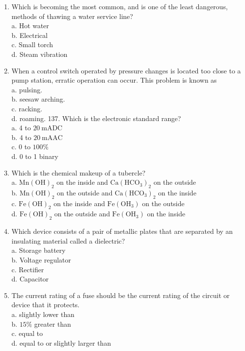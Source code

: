 \documentclass[10pt]{article}
\begin{document}
\begin{enumerate}
  \item Which is becoming the most common, and is one of the least dangerous, methods of thawing a water service line?\\
a. Hot water\\
b. Electrical\\
c. Small torch\\
d. Steam vibration

  \item When a control switch operated by pressure changes is located too close to a pump station, erratic operation can occur. This problem is known as\\
a. pulsing.\\
b. seesaw arching.\\
c. racking.\\
d. roaming. 137. Which is the electronic standard range?\\
a. 4 to $20 \mathrm{~mA} \mathrm{DC}$\\
b. 4 to $20 \mathrm{~mA} \mathrm{AC}$\\
c. 0 to $100 \%$\\
d. 0 to 1 binary

  \item Which is the chemical makeup of a tubercle?\\
a. $\mathrm{Mn}(\mathrm{OH})_{2}$ on the inside and $\mathrm{Ca}\left(\mathrm{HCO}_{3}\right)_{2}$ on the outside\\
b. $\mathrm{Mn}(\mathrm{OH})_{2}$ on the outside and $\mathrm{Ca}\left(\mathrm{HCO}_{3}\right)_{2}$ on the inside\\
c. $\mathrm{Fe}(\mathrm{OH})_{2}$ on the inside and $\mathrm{Fe}\left(\mathrm{OH}_{3}\right)$ on the outside\\
d. $\mathrm{Fe}(\mathrm{OH})_{2}$ on the outside and $\mathrm{Fe}\left(\mathrm{OH}_{3}\right)$ on the inside

  \item Which device consists of a pair of metallic plates that are separated by an insulating material called a dielectric?\\
a. Storage battery\\
b. Voltage regulator\\
c. Rectifier\\
d. Capacitor

  \item The current rating of a fuse should be the current rating of the circuit or device that it protects.\\
a. slightly lower than\\
b. $15 \%$ greater than\\
c. equal to\\
d. equal to or slightly larger than


\end{enumerate}
\end{document}
